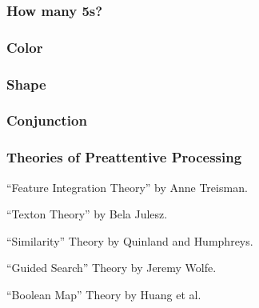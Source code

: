 \documentclass[12pt]{beamer}\usepackage[]{graphicx}\usepackage[]{color}
\begin{document}
\begin{frame}
\frametitle{How many 5s?}
\begin{center}
\end{center}
\end{frame}


\begin{frame}
\frametitle{Color}
\begin{center}
\end{center}
\end{frame}


\begin{frame}
\frametitle{Shape}
\begin{center}
\end{center}
\end{frame}


\begin{frame}
\frametitle{Conjunction}
\begin{center}
\end{center}
\end{frame}


\begin{frame}
\frametitle{Theories of Preattentive Processing}

\bbi
  \item ``Feature Integration Theory'' by Anne Treisman.
  \item ``Texton Theory'' by Bela Julesz.
  \item ``Similarity'' Theory by Quinland and Humphreys.
  \item ``Guided Search'' Theory by Jeremy Wolfe.
  \item ``Boolean Map'' Theory by Huang et al.
\ei

\end{frame}


\begin{frame}
\begin{center}
\Huge{}
\end{center}
\end{frame}
\end{document}

